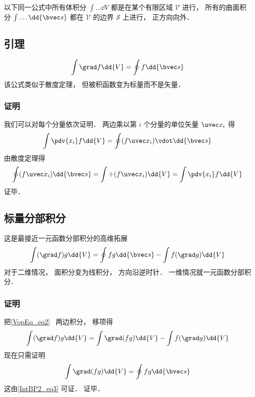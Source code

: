 

以下同一公式中所有体积分 $\int \dots \dd{V}$ 都是在某个有限区域 $\mathcal V$ 进行， 所有的曲面积分 $\int \dots \dd{\bvec s}$ 都在 $\mathcal V$ 的边界 $\mathcal S$ 上进行， 正方向向外．

\subsection{引理}
\begin{equation}\label{IntBP2_eq3}
\int \grad f \dd{V} = \oint f \dd{\bvec s}
\end{equation}
该公式类似于散度定理， 但被积函数变为标量而不是矢量．

\subsubsection{证明}
我们可以对每个分量依次证明． 两边乘以第 $i$ 个分量的单位矢量 $\uvec x_i$ 得
\begin{equation}
\int \pdv{x_i}f \dd{V} = \oint (f\uvec x_i) \vdot \dd{\bvec s}
\end{equation}
由散度定理得
\begin{equation}
\oint (f\uvec x_i) \dd{\bvec s} = \int \div (f\uvec x_i) \dd{V} = \int \pdv{x_i} f \dd{V}
\end{equation}
证毕．

\subsection{标量分部积分}
这是最接近一元函数分部积分的高维拓展
\begin{equation}\label{IntBP2_eq2}
\int (\grad f) g \dd{V} = \oint fg \dd{\bvec s} - \int f (\grad g) \dd{V}
\end{equation}
对于二维情况， 面积分变为线积分， 方向沿逆时针． 一维情况就一元函数分部积分．

\subsubsection{证明}
把\autoref{VopEq_eq2}~ 两边积分， 移项得
\begin{equation}
\int (\grad f) g \dd{V} = \int \grad (fg) \dd{V} - \int f (\grad g) \dd{V}
\end{equation}
现在只需证明
\begin{equation}
\int \grad (fg) \dd{V} = \oint fg \dd{\bvec s}
\end{equation}
这由\autoref{IntBP2_eq3} 可证． 证毕．

